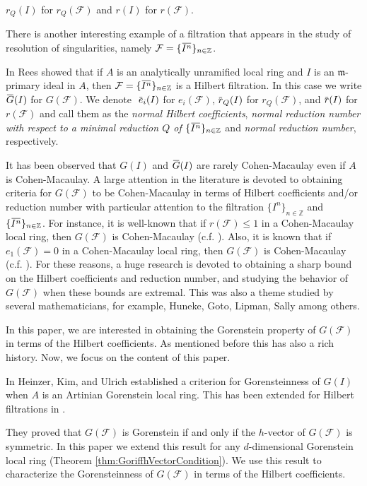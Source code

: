 \documentclass[12pt]{amsart}
\theoremstyle{definition}
\theoremstyle{remark}
\numberwithin{equation}{section}
\newcommand{\m}{{\mathfrak m}}
\newcommand{\FF}{\mathcal{F}}
\newcommand{\ol}[1]{\mkern 1.5mu\overline{\mkern-1.5mu#1\mkern-1.5mu}\mkern 1.5mu} %
\begin{document}
${r}_Q(I)$ for $r_Q(\mathcal{F})$ and ${r}(I)$ for $r(\mathcal{F}).$
\par 
There is another interesting example of a filtration that appears 
in the study of resolution of singularities, 
namely $\FF=\{\ol{I^n}\}_{n \in \mathbb{Z}}$. 
\par 
In \cite{Rees} Rees showed that if $A$ is an analytically unramified
local ring and $I$ is an $\m$-primary ideal in $A$, 
then $\FF = \{\ol{I^n}\}_{n \in \mathbb{Z}}$ is a Hilbert filtration. 
In this case we write $\ol{G}(I)$ for $G(\FF)$. 
We denote $~\ol{e}_i(I)$ for $e_i(\FF)$, $\ol{r}_Q(I)$ for $r_Q(\mathcal{F})$,  and $\ol{r}(I)$ for $r(\mathcal{F})$ 
and call them as the {\it normal Hilbert coefficients}, 
{\it normal reduction number with respect to a minimal reduction $Q$ 
of $\{\ol{I^n}\}_{n \in \mathbb{Z}}$} and {\it normal reduction number},  respectively.
\par 
It has been observed that $G(I)$ and $\ol{G}(I)$ are 
rarely Cohen-Macaulay even if $A$ is Cohen-Macaulay. 
A large attention in the literature is devoted to obtaining criteria for 
$G(\FF)$ to be Cohen-Macaulay in terms of Hilbert coefficients 
and/or reduction number with particular attention 
to the filtration $\{I^n\}_{n \in \mathbb{Z}}$ and 
$\{\ol{I^n}\}_{n \in \mathbb{Z}}$. 
For instance, it is well-known that  if $r(\FF) \leq 1$ in a 
Cohen-Macaulay local ring, then $G(\FF)$ is Cohen-Macaulay 
(c.f. \cite{Mar89}). 
Also, it is known that if $e_1(\FF)=0 $ in a Cohen-Macaulay local ring, 
then $G(\FF)$ is Cohen-Macaulay (c.f. \cite{Mar89}). 
For these reasons, a huge research is devoted to obtaining 
a sharp bound on the Hilbert coefficients and reduction number, 
and studying the behavior of $G(\FF)$ when these bounds 
are extremal. This was also a theme studied 
by several mathematicians, for example, Huneke, Goto, Lipman, 
Sally among others.
\par 
In this paper, we are interested in obtaining 
the Gorenstein property of $G(\FF)$
in terms of the Hilbert coefficients.
As mentioned before this has also a rich history. 
Now, we focus on the content of this paper.
\par 
In \cite{HKU2005} Heinzer, Kim, and Ulrich established a criterion for Gorensteinness of $G(I)$ when $A$ is an Artinian Gorenstein local ring.
This has been extended for Hilbert filtrations in \cite{HKU}.

\par 
They proved that $G(\FF)$ is Gorenstein if and only if 
the $h$-vector of $G(\FF)$ is symmetric.
In this paper we extend this result for any $d$-dimensional Gorenstein local ring (Theorem \ref{thm:GoriffhVectorCondition}). 
We use this result to characterize the Gorensteinness 
of $G(\FF)$ in terms of the Hilbert coefficients.
\end{document}
